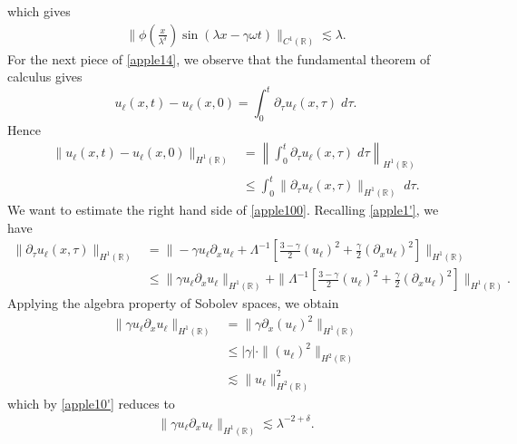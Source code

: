 \documentclass[12pt,reqno]{amsart}
\newcommand{\rr}{\mathbb{R}}
\newcommand{\p}{\partial}
\theoremstyle{plain}  %
\theoremstyle{definition}
\begin{document}
which gives
\begin{equation}
	\begin{split}
		\|\phi\left( \frac{x}{\lambda^\delta} \right) \sin(\lambda x - \gamma \omega t)
		\|_{C^1(\rr)}
		\lesssim \lambda.
		\label{apple15}
	\end{split}
\end{equation}
For the next piece of \eqref{apple14}, we observe that the fundamental theorem
of calculus gives
\begin{equation*}
	u_\ell(x,t) - u_\ell(x,0) = \int_0^t \p_\tau u_\ell(x,\tau) \; d \tau.
\end{equation*}
Hence
\begin{equation}
	\begin{split}
		\|u_\ell(x,t) - u_\ell(x,0)\|_{H^1(\rr)}
		& = \left \| \int_0^t \p_\tau
		u_\ell(x,\tau) \; d \tau \right \|_{H^1(\rr)}
		\\
		& \le  \int_0^t \|\p_\tau u_\ell (x,\tau) \|_{H^1(\rr)} \; d \tau.
		\label{apple100}
	\end{split}
\end{equation}
We want to estimate the right hand side of \eqref{apple100}. Recalling
\eqref{apple1'}, we have
\begin{equation}
	\label{apple101}
	\begin{split}
		\|\p_\tau u_\ell(x,\tau) \|_{H^1(\rr)}
		& =  \|-\gamma u_\ell \p_x u_\ell + \Lambda^{-1} \left[
		\frac{3-\gamma}{2}(u_\ell)^2 + \frac{\gamma}{2} \left( \p_x u_\ell \right)^2
		\right] \|_{H^1(\rr)}
		\\
		& \le \|\gamma u_\ell \p_x u_\ell \|_{H^1(\rr)} + \|\Lambda^{-1} \left[
		\frac{3-\gamma}{2} (u_\ell)^2 + \frac{\gamma}{2} \left( \p_x u_\ell \right)^2
		\right] \|_{H^1(\rr)}.
	\end{split}
\end{equation}
Applying the algebra property of Sobolev spaces, we obtain
\begin{equation*}
	\begin{split}
		\|\gamma u_\ell \p_x u_\ell \|_{H^1(\rr)} &
		= \|\gamma \p_x (u_\ell)^2 \|_{H^1(\rr)}
		\\
		& \le |\gamma| \cdot \| (u_\ell)^2 \|_{H^2(\rr)}
		\\
		& \lesssim \|u_\ell\|_{H^2(\rr)}^2
	\end{split}
\end{equation*}
which by \eqref{apple10'} reduces to
\begin{equation}
	\begin{split}
		\|\gamma u_\ell \p_x u_\ell \|_{H^1(\rr)} \lesssim \lambda^{-2 + \delta}.
		\label{apple102}
	\end{split}
\end{equation}
\end{document}
